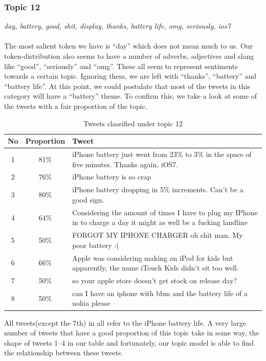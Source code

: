 \subsubsection{Topic 12}
\label{sec:topic-12}
\textit{day, battery, good, shit, display, thanks, battery life, omg, seriously, ios7}\\\\
The most salient token we have is ``day'' which does not mean much to us. Our token-distribution
also seems to have a number of adverbs, adjectives and slang like ``good'', ``seriously'' and
``omg''. These all seem to represent sentiments towards a certain topic. Ignoring them, we are left
with ``thanks'', ``battery'' and ``battery life''. At this point, we could postulate that most of
the tweets in this category will have a ``battery'' theme. To confirm this, we take a look at some
of the tweets with a fair proportion of the topic.

\begin{table}[H]
  \begin{tabular}{c c p{13cm}} \toprule
    No & Proportion & Tweet \\ \midrule
    1  & 81\%       & iPhone battery just went from 23\% to 3\% in the space of five minutes. Thanks again, iOS7. \\ \midrule
    2  & 76\%       & iPhone battery is so crap \\ \midrule
    3  & 80\%       & iPhone battery dropping in 5\% increments. Can't be a good sign. \\ \midrule
    4  & 64\%       & Considering the amount of times I have to plug my IPhone in to charge a day it might as well be a fucking landline \\ \midrule
    5  & 50\%       & FORGOT MY IPHONE CHARGER oh shit man. My poor battery :( \\ \midrule
    6  & 66\%       & Apple was considering making an iPod for kids but apparently, the name iTouch Kids didn't sit too well. \\ \midrule
    7  & 50\%       & so your apple store doesn't get stock on release day? \\ \midrule
    8  & 50\%       & can I have an iphone with bbm and the battery life of a nokia please \\ \bottomrule
  \end{tabular}
  \caption{Tweets classified under topic 12}
  \label{tab:topic-12-tweets}
\end{table}

All tweets(except the 7th) in  all refer to the iPhone battery life. A
very large number of tweets that have a good proportion of this topic take in some way, the shape of
tweets 1--4 in our table and fortunately, our topic model is able to find the relationship between
these tweets.

